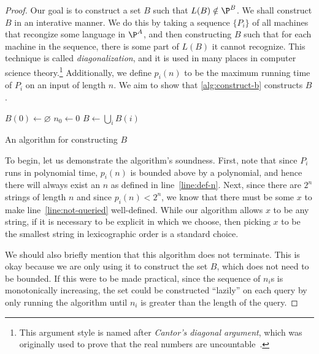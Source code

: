 \documentclass[english,12pt]{reedthesis}
\theoremstyle{plain}
\theoremstyle{definition}
\theoremstyle{remark}
\begin{document}
\begin{proof}
  Our goal is to construct a set $B$ such that $L(B) \notin \P^{B}$. We shall
  construct $B$ in an interative manner. We do this by taking a sequence
  $\{P_{i}\}$ of all machines that recongize some language in $\P^{A}$, and then
  constructing $B$ such that for each machine in the sequence, there is some
  part of $L(B)$ it cannot recognize. This technique is called
  \emph{diagonalization}, and it is used in many places
  in computer science theory.\footnote{This argument style is named after
    \emph{Cantor's diagonal argument}, which was originally used to prove that
    the real numbers are uncountable~\cite[Thm. 2.14]{Ru76}.} Additionally, we
  define $p_{i}(n)$ to be the maximum running time of $P_{i}$ on an input of
  length $n$. We aim to show that \cref{alg:construct-b} constructs $B$.

  \begin{algorithm}[htbp]
    $B(0) \leftarrow \varnothing$\;
    $n_{0} \leftarrow 0$\;
    $B \leftarrow \bigcup_{i}B(i)$\;
    \caption{An algorithm for constructing $B$}\label{alg:construct-b}
  \end{algorithm}

  To begin, let us demonstrate the algorithm's soundness. First, note that since
  $P_{i}$ runs in polynomial time, $p_{i}(n)$ is bounded above by a polynomial,
  and hence there will always exist an $n$ as defined in line~\ref{line:def-n}.
  Next, since there are $2^{n}$ strings of length $n$ and since
  $p_{i}(n) < 2^{n}$, we know that there must be some $x$ to make
  line~\ref{line:not-queried} well-defined. While our algorithm allows $x$ to be
  any string, if it is necessary to be explicit in which we choose, then picking
  $x$ to be the smallest string in lexicographic order is a standard choice.

  We should also briefly mention that this algorithm does not terminate. This is
  okay because we are only using it to construct the set $B$, which does not
  need to be bounded. If this were to be made practical, since the sequence of
  $n_{i}$s is monotonically increasing, the set could be constructed ``lazily''
  on each query by only running the algorithm until $n_{i}$ is greater than the
  length of the query.


\end{proof}
\end{document}
